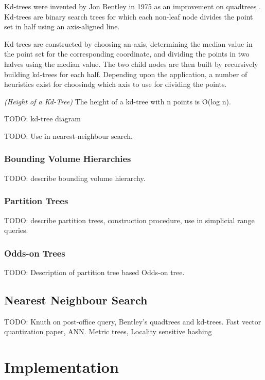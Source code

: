 \documentclass[mcs]{scsthesis}
\begin{document}
Kd-trees were invented by Jon Bentley in 1975 as an improvement on quadtrees
\cite{bentley}.  Kd-trees are binary search trees for which each non-leaf node
divides the point set in half using an axis-aligned line.

Kd-trees are constructed by choosing an axis, determining the median value in
the point set for the corresponding coordinate, and dividing the points in two
halves using the median value.  The two child nodes are then built by
recursively building kd-trees for each half.  Depending upon the application,
a number of heuristics exist for choosindg which axis to use for dividing the
points.

\begin{thm} \emph{(Height of a Kd-Tree)}
The height of a kd-tree with n points is O(log n).
\end{thm}

TODO: kd-tree diagram

TODO: Use in nearest-neighbour search.

\subsection{Bounding Volume Hierarchies}

TODO: describe bounding volume hierarchy.

\subsection{Partition Trees}

TODO: describe partition trees, construction procedure, use in simplicial
range queries.

\subsection{Odds-on Trees}

TODO: Description of partition tree based Odds-on tree.

\section{Nearest Neighbour Search}

TODO: Knuth on post-office query, Bentley's quadtrees and kd-trees.  Fast
vector quantization paper, ANN.  Metric trees, Locality sensitive hashing


\chapter{Implementation}
\end{document}
